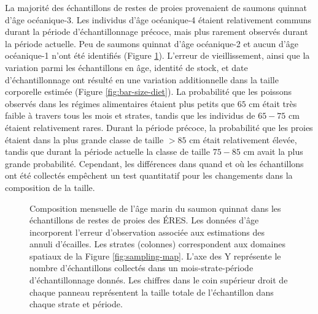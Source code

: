 La majorité des échantillons de restes de proies provenaient de saumons quinnat d'âge océanique-3. Les individus d'âge océanique-4 étaient relativement communs durant la période d'échantillonnage précoce, mais plus rarement observés durant la période actuelle. Peu de saumons quinnat d'âge océanique-2 et aucun d'âge océanique-1 n'ont été identifiés (Figure \ref{fig:bar-age-diet}). L'erreur de vieillissement, ainsi que la variation parmi les échantillons en âge, identité de stock, et date d'échantillonnage ont résulté en une variation additionnelle dans la taille corporelle estimée (Figure \ref{fig:bar-size-diet}). La probabilité que les poissons observés dans les régimes alimentaires étaient plus petits que $65$ cm était très faible à travers tous les mois et strates, tandis que les individus de $65-75$ cm étaient relativement rares. Durant la période précoce, la probabilité que les proies étaient dans la plus grande classe de taille $>85$ cm était relativement élevée, tandis que durant la période actuelle la classe de taille $75-85$ cm avait la plus grande probabilité. Cependant, les différences dans quand et où les échantillons ont été collectés empêchent un test quantitatif pour les changements dans la composition de la taille.

\begin{figure}[H]
    \centering
    \caption{Composition mensuelle de l'âge marin du saumon quinnat dans les échantillons de restes de proies des ÉRES. Les données d'âge incorporent l'erreur d'observation associée aux estimations des annuli d'écailles. Les strates (colonnes) correspondent aux domaines spatiaux de la Figure \ref{fig:sampling-map}. L'axe des Y représente le nombre d'échantillons collectés dans un mois-strate-période d'échantillonnage donnés. Les chiffres dans le coin supérieur droit de chaque panneau représentent la taille totale de l'échantillon dans chaque strate et période.}
    \label{fig:bar-age-diet}
\end{figure}

